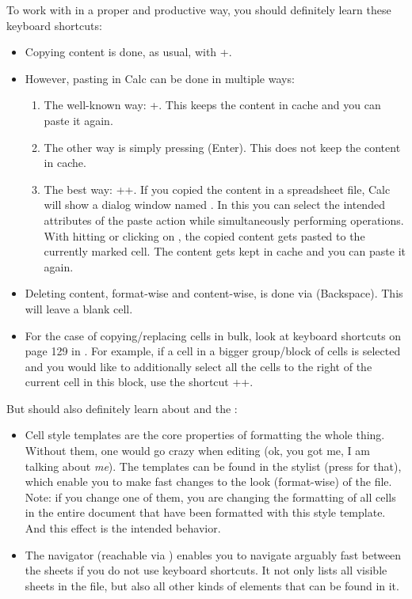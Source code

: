To work with \tfn in a proper and productive way, you should definitely learn these keyboard shortcuts:
\begin{itemize}
	\item Copying content is done, as usual, with +.
	\item However, pasting in Calc can be done in multiple ways:
	\begin{enumerate}
		\item The well-known way: +.
		This keeps the content in cache and you can paste it again.
		\item The other way is simply pressing \keystroke{\( \hookleftarrow \)} (Enter).
		This does not keep the content in cache.
		\item The best way: ++.
		If you copied the content in a spreadsheet file, Calc will show a dialog window named .
		In this you can select the intended attributes of the paste action while simultaneously performing operations.
		With hitting \keystroke{\( \hookleftarrow \)} or clicking on , the copied content gets pasted to the currently marked cell.
		The content gets kept in cache and you can paste it again.
	\end{enumerate}
	\item Deleting content, format-wise and content-wise, is done via \keystroke{\( \longleftarrow \)} (Backspace).
	This will leave a blank cell.
	\item For the case of copying/replacing cells in bulk, look at keyboard shortcuts on page 129 in .
	For example, if a cell in a bigger group/block of cells is selected and you would like to additionally select all the cells to the right of the current cell in this block, use the shortcut ++\keystroke{\( \rightarrow \)}.
\end{itemize}

But should also definitely learn about  and the :
\begin{itemize}
	\item Cell style templates are the core properties of formatting the whole thing.
	Without them, one would go crazy when editing \tfn (ok, you got me, I am talking about \emph{me}).
	The templates can be found in the stylist (press  for that), which enable you to make fast changes to the look (format-wise) of the file.
	Note: if you change one of them, you are changing the formatting of all cells in the entire document that have been formatted with this style template.
	And this effect is the intended behavior.
	\item The navigator (reachable via ) enables you to navigate arguably fast between the sheets if you do not use keyboard shortcuts.
	It not only lists all visible sheets in the file, but also all other kinds of elements that can be found in it.
\end{itemize}

